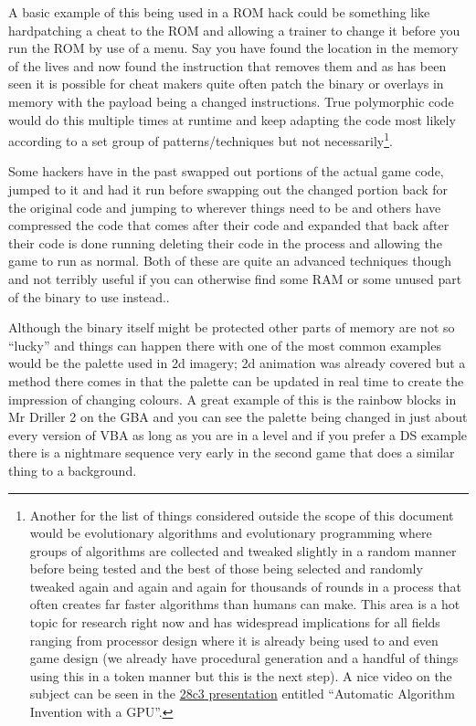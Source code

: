 \documentclass[
]{book}
\begin{document}
A basic example of this being used in a ROM hack could be something like hardpatching a cheat to the ROM and allowing a trainer to change it before you run the ROM by use of a menu. Say you have found the location in the memory of the lives and now found the instruction that removes them and as has been seen it is possible for cheat makers quite often patch the binary or overlays in memory with the payload being a changed instructions. True polymorphic code would do this multiple times at runtime and keep adapting the code most likely according to a set group of patterns/techniques but not necessarily\footnote{Another for the list of things considered outside the scope of this document would be evolutionary algorithms and evolutionary programming where groups of algorithms are collected and tweaked slightly in a random manner before being tested and the best of those being selected and randomly tweaked again and again and again for thousands of rounds in a process that often creates far faster algorithms than humans can make. This area is a hot topic for research right now and has widespread implications for all fields ranging from processor design where it is already being used to and even game design (we already have procedural generation and a handful of things using this in a token manner but this is the next step). A nice video on the subject can be seen in the \href{http://www.youtube.com/watch?v=tQvFZVlM2Gk}{28c3 presentation} entitled ``Automatic Algorithm Invention with a GPU''.}.

Some hackers have in the past swapped out portions of the actual game code, jumped to it and had it run before swapping out the changed portion back for the original code and jumping to wherever things need to be and others have compressed the code that comes after their code and expanded that back after their code is done running deleting their code in the process and allowing the game to run as normal. Both of these are quite an advanced techniques though and not terribly useful if you can otherwise find some RAM or some unused part of the binary to use instead..

Although the binary itself might be protected other parts of memory are not so ``lucky'' and things can happen there with one of the most common examples would be the palette used in 2d imagery; 2d animation was already covered but a method there comes in that the palette can be updated in real time to create the impression of changing colours. A great example of this is the rainbow blocks in Mr Driller 2 on the GBA and you can see the palette being changed in just about every version of VBA as long as you are in a level and if you prefer a DS example there is a nightmare sequence very early in the second game that does a similar thing to a background.
\end{document}
